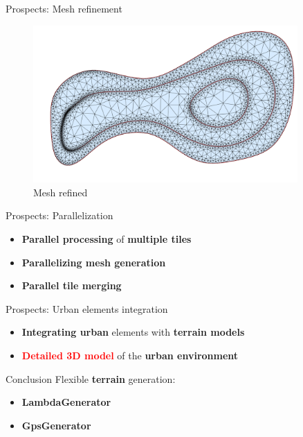 \documentclass[10pt]{beamer}
\begin{document}
\begin{frame}{Prospects: Mesh refinement}
  \begin{figure}[H]
    \centering
    \includegraphics[width=0.9\textwidth]{images/mesh-refined.png}
    \caption{Mesh refined}
\end{figure}
\end{frame}

\begin{frame}{Prospects: Parallelization}
  \Large
  \begin{itemize}
    \item \textbf{Parallel processing} of \textbf{multiple tiles}
    \item \textbf{Parallelizing mesh generation}
    \item \textbf{Parallel tile merging}
  \end{itemize}
\end{frame}

\begin{frame}{Prospects: Urban elements integration}
  \Large
  \begin{itemize}
    \item \textbf{Integrating urban} elements with \textbf{terrain models}
    \vspace{2em}
    \item \textbf{\textcolor{red}{Detailed 3D model}} of the \textbf{urban environment}
  \end{itemize}
\end{frame}

\begin{frame}{Conclusion}
  \Large
  Flexible \textbf{terrain} generation:
  \vspace{1em}
  \begin{itemize}
    \item \textbf{LambdaGenerator}
    \item \textbf{GpsGenerator}
  \end{itemize}
\end{frame}
\end{document}
